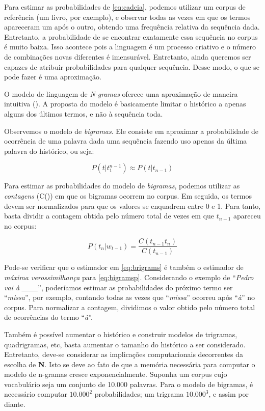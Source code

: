 Para estimar as probabilidades de \ref{eq:cadeia}, podemos utilizar um corpus de referência (um livro, por exemplo), e observar todas as vezes em que os termos apareceram um após o outro, obtendo uma frequência relativa da sequência dada. Entretanto, a probabilidade de se encontrar exatamente essa sequência no corpus é muito baixa. Isso acontece pois a linguagem é um processo criativo e o número de combinações novas diferentes é imensurável. Entretanto, ainda queremos ser capazes de atribuir probabilidades para qualquer sequência. Desse modo, o que se pode fazer é uma aproximação.

O modelo de linguagem de \textit{N-gramas} oferece uma aproximação de maneira intuitiva (\cite{Jurafsky:2009:SLP:1214993}). A proposta do modelo é basicamente limitar o histórico a apenas alguns dos últimos termos, e não à sequência toda. 

Observemos o modelo de \textit{bigramas}. Ele consiste em aproximar a probabilidade de ocorrência de uma palavra dada uma sequência
fazendo uso apenas da última palavra do histórico, ou seja:

\begin{equation}
\label{eq:bigramsp}
    P(t|t_{1}^{n-1}) \approx P(t|t_{n-1})
\end{equation}

Para estimar as probabilidades do modelo de \textit{bigramas}, podemos utilizar as \textit{contagens} (C()) em que os bigramas ocorrem no corpus. Em seguida, os termos devem ser normalizados para que os valores se enquadrem entre 0 e 1. Para tanto, basta dividir a contagem obtida pelo número total de vezes em que $t_{n-1}$ apareceu no corpus:

\begin{equation}
\label{eq:brigrams}
    P(t_n|w_{t-1}) = \frac{C(t_{n-1}t_n)}{C(t_{n-1})}
\end{equation}

Pode-se verificar que o estimador em \ref{eq:brigrams} é também o estimador de \textit{máxima verossimilhança} para \ref{eq:bigramsp}.
Considerando o exemplo de “\textit{Pedro vai à \_\_\_}”, poderíamos estimar as probabilidades do próximo termo ser “\textit{missa}”, por exemplo, contando todas as vezes que “\textit{missa}” ocorreu após “\textit{à}” no corpus. Para normalizar a contagem, dividimos o valor obtido pelo número total de ocorrências do termo “\textit{à}”.

Também é possível aumentar o histórico e construir modelos de trigramas, quadrigramas, etc, basta aumentar o tamanho do histórico a ser considerado. Entretanto, deve-se considerar as implicações computacionais decorrentes da escolha de \textbf{N}. Isto se deve ao fato de que a memória necessária para computar o modelo de n-gramas cresce exponencialmente. Suponha um corpus cujo vocabulário seja um conjunto de 10.000 palavras. Para o modelo de bigramas, é necessário computar $10.000^{2}$ probabilidades; um trigrama $10.000^{3}$, e assim por diante.

